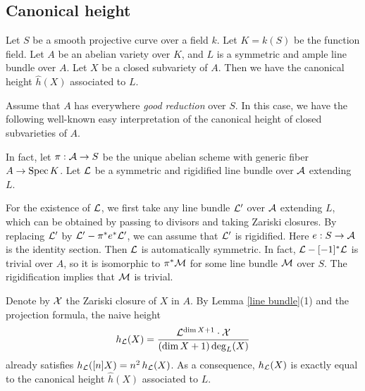 \subsection{Canonical height}

Let $S$ be a smooth projective curve over a field $k$.
Let $K=k(S)$ be the function field.
Let $A$ be an abelian variety over $K$, and $L$ is a symmetric and ample line bundle over $A$.
Let $X$ be a closed subvariety of $A$.
Then we have the canonical height $\hat h(X)$ associated to $L$.

Assume that $A$ has everywhere \emph{good reduction} over $S$.
In this case, we have the following well-known easy interpretation of the canonical height of closed subvarieties of $A$.

In fact, let $\pi:{\mathcal A}\to S$ be the unique abelian scheme with generic fiber $A\to {\rm Spec \,} K$.
Let ${\mathcal L}$ be a symmetric and rigidified line bundle over ${\mathcal A}$ extending $L$.

For the existence of ${\mathcal L}$, we first take any line bundle ${\mathcal L}'$ over ${\mathcal A}$ extending $L$, which can be obtained by passing to divisors and taking Zariski closures.
By replacing ${\mathcal L}'$ by ${\mathcal L}'-\pi^*e^*{\mathcal L}'$, we can assume that ${\mathcal L}'$ is rigidified.  Here $e:S\to{\mathcal A}$ is the identity section.
Then ${\mathcal L}$ is automatically symmetric.
In fact, ${\mathcal L}-[-1]^*{\mathcal L}$ is trivial over $A$, so it is isomorphic to $\pi^*{\mathcal M}$ for some line bundle ${\mathcal M}$ over $S$.
The rigidification implies that ${\mathcal M}$ is trivial.

Denote by ${\mathcal X}$ the Zariski closure of $X$ in $A$.
By Lemma \ref{line bundle}(1) and the projection formula, the naive height
$$
h_{{\mathcal L}}(X)=\frac{{\mathcal L}^{\dim X+1}\cdot {\mathcal X}}{(\dim X+1)\deg_L(X)}
$$
already satisfies
$h_{{\mathcal L}}([n]X)=n^2\, h_{{\mathcal L}}(X)$.
As a consequence, $h_{{\mathcal L}}(X)$ is exactly equal to the canonical height
$\hat h(X)$ associated to $L$.

